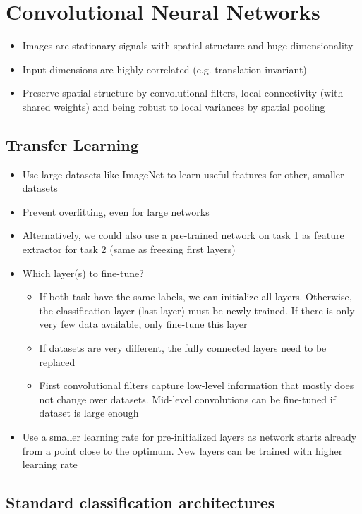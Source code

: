 \section{Convolutional Neural Networks}
\begin{itemize}
	\item Images are stationary signals with spatial structure and huge dimensionality
	\item Input dimensions are highly correlated (e.g. translation invariant)
	\item Preserve spatial structure by convolutional filters, local connectivity (with shared weights) and being robust to local variances by spatial pooling
\end{itemize}
\subsection{Transfer Learning}
\begin{itemize}
	\item Use large datasets like ImageNet to learn useful features for other, smaller datasets
	\item Prevent overfitting, even for large networks
	\item Alternatively, we could also use a pre-trained network on task 1 as feature extractor for task 2 (same as freezing first layers)
	\item Which layer(s) to fine-tune?
	\begin{itemize}
		\item If both task have the same labels, we can initialize all layers. Otherwise, the classification layer (last layer) must be newly trained. If there is only very few data available, only fine-tune this layer
		\item If datasets are very different, the fully connected layers need to be replaced
		\item First convolutional filters capture low-level information that mostly does not change over datasets. Mid-level convolutions can be fine-tuned if dataset is large enough
	\end{itemize}
	\item Use a smaller learning rate for pre-initialized layers as network starts already from a point close to the optimum. New layers can be trained with higher learning rate
\end{itemize}
\subsection{Standard classification architectures}
